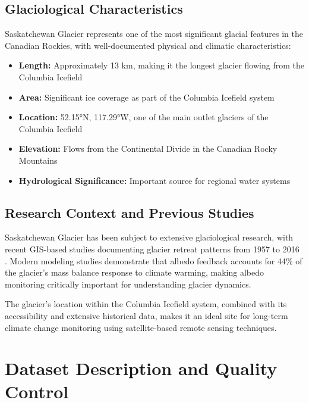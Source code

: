 \documentclass[12pt,a4paper]{article}
\begin{document}
\subsection{Glaciological Characteristics}

Saskatchewan Glacier represents one of the most significant glacial features in the Canadian Rockies, with well-documented physical and climatic characteristics:

\begin{itemize}
    \item \textbf{Length:} Approximately 13 km, making it the longest glacier flowing from the Columbia Icefield \cite{marshall_modelling_2022}
    \item \textbf{Area:} Significant ice coverage as part of the Columbia Icefield system \cite{marshall_modelling_2022}
    \item \textbf{Location:} 52.15°N, 117.29°W, one of the main outlet glaciers of the Columbia Icefield \cite{marshall_modelling_2022}
    \item \textbf{Elevation:} Flows from the Continental Divide in the Canadian Rocky Mountains
    \item \textbf{Hydrological Significance:} Important source for regional water systems \cite{gis_saskatchewan_2016}
\end{itemize}

\subsection{Research Context and Previous Studies}

Saskatchewan Glacier has been subject to extensive glaciological research, with recent GIS-based studies documenting glacier retreat patterns from 1957 to 2016 \cite{gis_saskatchewan_2016}. Modern modeling studies \cite{marshall_modelling_2022} demonstrate that albedo feedback accounts for 44\% of the glacier's mass balance response to climate warming, making albedo monitoring critically important for understanding glacier dynamics.

The glacier's location within the Columbia Icefield system, combined with its accessibility and extensive historical data, makes it an ideal site for long-term climate change monitoring using satellite-based remote sensing techniques.

\section{Dataset Description and Quality Control}
\end{document}
